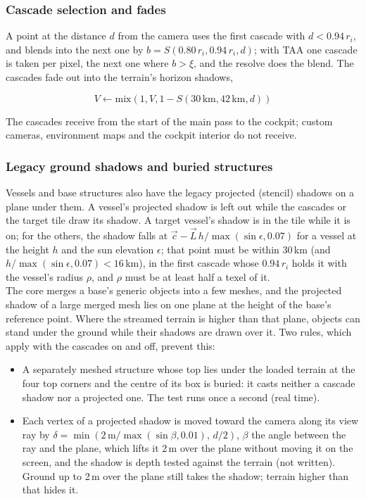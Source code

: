 \documentclass[Orbiter Technical Reference.tex]{subfiles}
\begin{document}
\begin{sloppypar}
\subsubsection{Cascade selection and fades}
A point at the distance $d$ from the camera uses the first cascade with $d < 0.94\,r_{i}$, and blends into the next one by $b = S(0.80\,r_{i}, 0.94\,r_{i}, d)$; with TAA one cascade is taken per pixel, the next one where $b > \xi$, and the resolve does the blend. The cascades fade out into the terrain's horizon shadows,

\[ V \leftarrow \mathrm{mix}\left(1, V, 1 - S(30\,\mathrm{km}, 42\,\mathrm{km}, d)\right) \]

\noindent
The cascades receive from the start of the main pass to the cockpit; custom cameras, environment maps and the cockpit interior do not receive.

\subsubsection{Legacy ground shadows and buried structures}
Vessels and base structures also have the legacy projected (stencil) shadows on a plane under them. A vessel's projected shadow is left out while the cascades or the target tile draw its shadow. A target vessel's shadow is in the tile while it is on; for the others, the shadow falls at $\vec{c} - \vec{L}\,h/\max(\sin\epsilon, 0.07)$ for a vessel at the height $h$ and the sun elevation $\epsilon$; that point must be within 30\,km (and $h/\max(\sin\epsilon,0.07) < 16$\,km), in the first cascade whose $0.94\,r_{i}$ holds it with the vessel's radius $\rho$, and $\rho$ must be at least half a texel of it.\\
The core merges a base's generic objects into a few meshes, and the projected shadow of a large merged mesh lies on one plane at the height of the base's reference point. Where the streamed terrain is higher than that plane, objects can stand under the ground while their shadows are drawn over it. Two rules, which apply with the cascades on and off, prevent this:

\begin{itemize}
\item A separately meshed structure whose top lies under the loaded terrain at the four top corners and the centre of its box is buried: it casts neither a cascade shadow nor a projected one. The test runs once a second (real time).
\item Each vertex of a projected shadow is moved toward the camera along its view ray by $\delta = \min(2\,\mathrm{m}/\max(\sin\beta, 0.01),\, d/2)$, $\beta$ the angle between the ray and the plane, which lifts it 2\,m over the plane without moving it on the screen, and the shadow is depth tested against the terrain (not written). Ground up to 2\,m over the plane still takes the shadow; terrain higher than that hides it.
\end{itemize}




\end{sloppypar}
\end{document}
